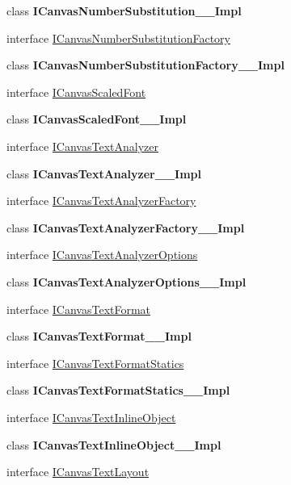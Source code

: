 \begin{DoxyCompactItemize}
\item 
class {\bfseries I\+Canvas\+Number\+Substitution\+\_\+\+\_\+\+Impl}
\item 
interface \hyperlink{interface_microsoft_1_1_graphics_1_1_canvas_1_1_text_1_1_i_canvas_number_substitution_factory}{I\+Canvas\+Number\+Substitution\+Factory}
\item 
class {\bfseries I\+Canvas\+Number\+Substitution\+Factory\+\_\+\+\_\+\+Impl}
\item 
interface \hyperlink{interface_microsoft_1_1_graphics_1_1_canvas_1_1_text_1_1_i_canvas_scaled_font}{I\+Canvas\+Scaled\+Font}
\item 
class {\bfseries I\+Canvas\+Scaled\+Font\+\_\+\+\_\+\+Impl}
\item 
interface \hyperlink{interface_microsoft_1_1_graphics_1_1_canvas_1_1_text_1_1_i_canvas_text_analyzer}{I\+Canvas\+Text\+Analyzer}
\item 
class {\bfseries I\+Canvas\+Text\+Analyzer\+\_\+\+\_\+\+Impl}
\item 
interface \hyperlink{interface_microsoft_1_1_graphics_1_1_canvas_1_1_text_1_1_i_canvas_text_analyzer_factory}{I\+Canvas\+Text\+Analyzer\+Factory}
\item 
class {\bfseries I\+Canvas\+Text\+Analyzer\+Factory\+\_\+\+\_\+\+Impl}
\item 
interface \hyperlink{interface_microsoft_1_1_graphics_1_1_canvas_1_1_text_1_1_i_canvas_text_analyzer_options}{I\+Canvas\+Text\+Analyzer\+Options}
\item 
class {\bfseries I\+Canvas\+Text\+Analyzer\+Options\+\_\+\+\_\+\+Impl}
\item 
interface \hyperlink{interface_microsoft_1_1_graphics_1_1_canvas_1_1_text_1_1_i_canvas_text_format}{I\+Canvas\+Text\+Format}
\item 
class {\bfseries I\+Canvas\+Text\+Format\+\_\+\+\_\+\+Impl}
\item 
interface \hyperlink{interface_microsoft_1_1_graphics_1_1_canvas_1_1_text_1_1_i_canvas_text_format_statics}{I\+Canvas\+Text\+Format\+Statics}
\item 
class {\bfseries I\+Canvas\+Text\+Format\+Statics\+\_\+\+\_\+\+Impl}
\item 
interface \hyperlink{interface_microsoft_1_1_graphics_1_1_canvas_1_1_text_1_1_i_canvas_text_inline_object}{I\+Canvas\+Text\+Inline\+Object}
\item 
class {\bfseries I\+Canvas\+Text\+Inline\+Object\+\_\+\+\_\+\+Impl}
\item 
interface \hyperlink{interface_microsoft_1_1_graphics_1_1_canvas_1_1_text_1_1_i_canvas_text_layout}{I\+Canvas\+Text\+Layout}

\end{DoxyCompactItemize}
